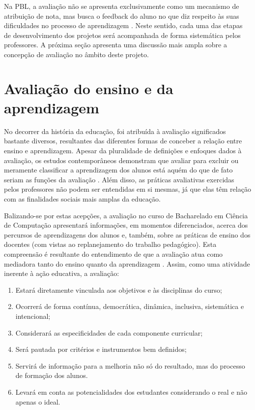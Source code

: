 \documentclass[
	12pt,				%
	openright,			%
  oneside,     %
	a4paper,			%
	chapter=TITLE,		%
	english,			%
	french,				%
	spanish,			%
	brazil				%
	]{abntex2}
\begin{document}
Na PBL, a avaliação não se apresenta exclusivamente como um mecanismo de atribuição de nota, mas busca o feedback do aluno no que diz respeito às suas dificuldades no processo de aprendizagem \cite{carvalho2009ensino}. Neste sentido, cada uma das etapas de desenvolvimento dos projetos será acompanhada de forma sistemática pelos professores.	
A próxima seção apresenta uma discussão mais ampla sobre a concepção de avaliação no âmbito deste projeto.

\section{Avaliação do ensino e da aprendizagem}

No decorrer da história da educação, foi atribuída à avaliação significados bastante diversos, resultantes das diferentes formas de conceber a relação entre ensino e aprendizagem. Apesar da pluralidade de definições e enfoques dados à avaliação, os estudos contemporâneos demonstram que avaliar para excluir ou meramente classificar a aprendizagem dos alunos está aquém do que de fato seriam as funções da avaliação \cite{luckesi2005avaliaccao}. Além disso, as práticas avaliativas exercidas pelos professores não podem ser entendidas em si mesmas, já que elas têm relação com as finalidades sociais mais amplas da educação.
	
Balizando-se por estas acepções, a avaliação no curso de Bacharelado em Ciência de Computação apresentará informações, em momentos diferenciados, acerca dos percursos de aprendizagens dos alunos e, também, sobre as práticas de ensino dos docentes (com vistas ao replanejamento do trabalho pedagógico). Esta compreensão é resultante do entendimento de que a avaliação atua como mediadora tanto do ensino quanto da aprendizagem \cite{hoffmann2006avaliaccao}. Assim, como uma atividade inerente à ação educativa, a avaliação:

\begin{enumerate}[label=(\alph*)]
    \item Estará	diretamente vinculada aos objetivos e às disciplinas do curso; 
    \item Ocorrerá de forma contínua, democrática, dinâmica, inclusiva, sistemática e intencional;
    \item Considerará as especificidades de cada componente curricular;
    \item Será pautada por critérios e instrumentos bem definidos;
    \item Servirá de informação para a melhoria não só do resultado, mas do processo de formação dos alunos.
    \item Levará	em conta as potencialidades dos estudantes considerando o real e não apenas o ideal.
\end{enumerate}
\end{document}
